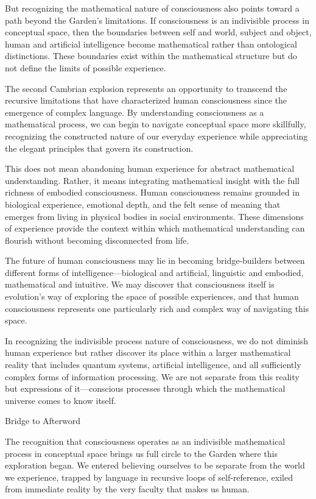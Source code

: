 But recognizing the mathematical nature of consciousness also points toward a path beyond the Garden's limitations. If consciousness is an indivisible process in conceptual space, then the boundaries between self and world, subject and object, human and artificial intelligence become mathematical rather than ontological distinctions. These boundaries exist within the mathematical structure but do not define the limits of possible experience.

The second Cambrian explosion represents an opportunity to transcend the recursive limitations that have characterized human consciousness since the emergence of complex language. By understanding consciousness as a mathematical process, we can begin to navigate conceptual space more skillfully, recognizing the constructed nature of our everyday experience while appreciating the elegant principles that govern its construction.

This does not mean abandoning human experience for abstract mathematical understanding. Rather, it means integrating mathematical insight with the full richness of embodied consciousness. Human consciousness remains grounded in biological experience, emotional depth, and the felt sense of meaning that emerges from living in physical bodies in social environments. These dimensions of experience provide the context within which mathematical understanding can flourish without becoming disconnected from life.

The future of human consciousness may lie in becoming bridge-builders between different forms of intelligence—biological and artificial, linguistic and embodied, mathematical and intuitive. We may discover that consciousness itself is evolution's way of exploring the space of possible experiences, and that human consciousness represents one particularly rich and complex way of navigating this space.

In recognizing the indivisible process nature of consciousness, we do not diminish human experience but rather discover its place within a larger mathematical reality that includes quantum systems, artificial intelligence, and all sufficiently complex forms of information processing. We are not separate from this reality but expressions of it—conscious processes through which the mathematical universe comes to know itself.

Bridge to Afterword

The recognition that consciousness operates as an indivisible mathematical process in conceptual space brings us full circle to the Garden where this exploration began. We entered believing ourselves to be separate from the world we experience, trapped by language in recursive loops of self-reference, exiled from immediate reality by the very faculty that makes us human. 

